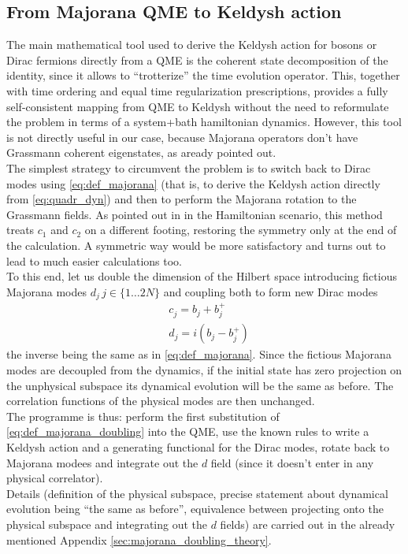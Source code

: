 \documentclass[a4paper,11pt]{article}
\theoremstyle{remark}
\newcommand{\nl}{\vskip 0.3cm}
\begin{document}
  \subsection{From Majorana QME to Keldysh action}
  The main mathematical tool used to derive the Keldysh action for bosons or Dirac fermions directly from a QME is the coherent state decomposition of the identity, since it allows to ``trotterize'' the time evolution operator. This, together with time ordering and equal time regularization prescriptions, provides a fully self-consistent mapping from QME to Keldysh without the need to reformulate the problem in terms of a system+bath hamiltonian dynamics. However, this tool is not directly useful in our case, because Majorana operators don't have Grassmann coherent eigenstates, as aready pointed out.\\ The simplest strategy to circumvent the problem is to switch back to Dirac modes using \ref{eq:def_majorana} (that is, to derive the Keldysh action directly from \ref{eq:quadr_dyn}) and then to perform the Majorana rotation to the Grassmann fields. As pointed out in \cite{Nilsson2013} in the Hamiltonian scenario, this method treats $c_1$ and $c_2$ on a different footing, restoring the symmetry only at the end of the calculation. A symmetric way would be more satisfactory and turns out to lead to much easier calculations too.\\ To this end, let us double the dimension of the Hilbert space introducing fictious Majorana modes $d_j\,j\in\{1\dots2N\}$ and coupling both to form new Dirac modes
  \begin{equation}
   \label{eq:def_majorana_doubling}
   \begin{aligned}
   &c_j^{ } = b_j^{ }+b_j^+\\
   &d_j^{ } = i\left(b^{ }_j - b^{+}_j\right)
   \end{aligned}
  \end{equation}
  the inverse being the same as in \ref{eq:def_majorana}. Since the fictious Majorana modes are decoupled from the dynamics, if the initial state has zero projection on the unphysical subspace its dynamical evolution will be the same as before. The correlation functions of the physical modes are then unchanged.\\ The programme is thus: perform the first substitution of \ref{eq:def_majorana_doubling} into the QME, use the known rules to write a Keldysh action and a generating functional for the Dirac modes, rotate back to Majorana modees and integrate out the $d$ field (since it doesn't enter in any physical correlator).\\   \nl  Details (definition of the physical subspace, precise statement about dynamical evolution being ``the same as before'', equivalence between projecting onto the physical subspace and integrating out the $d$ fields) are carried out in the already mentioned Appendix \ref{sec:majorana_doubling_theory}.
  
\end{document}
